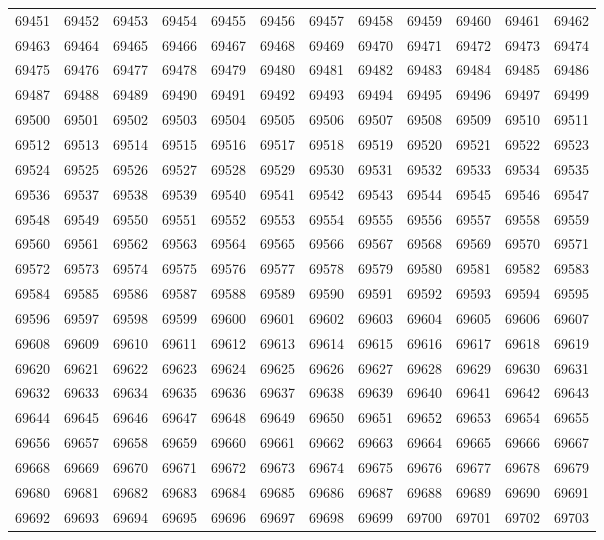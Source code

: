 \begin{center}
\begin{longtable}{llllllllllll}
69451 &69452 &69453 &69454 &69455 &69456 &69457 &69458 &69459 &69460 &69461 &69462 \\
69463 &69464 &69465 &69466 &69467 &69468 &69469 &69470 &69471 &69472 &69473 &69474 \\
69475 &69476 &69477 &69478 &69479 &69480 &69481 &69482 &69483 &69484 &69485 &69486 \\
69487 &69488 &69489 &69490 &69491 &69492 &69493 &69494 &69495 &69496 &69497 &69499 \\
69500 &69501 &69502 &69503 &69504 &69505 &69506 &69507 &69508 &69509 &69510 &69511 \\
69512 &69513 &69514 &69515 &69516 &69517 &69518 &69519 &69520 &69521 &69522 &69523 \\
69524 &69525 &69526 &69527 &69528 &69529 &69530 &69531 &69532 &69533 &69534 &69535 \\
69536 &69537 &69538 &69539 &69540 &69541 &69542 &69543 &69544 &69545 &69546 &69547 \\
69548 &69549 &69550 &69551 &69552 &69553 &69554 &69555 &69556 &69557 &69558 &69559 \\
69560 &69561 &69562 &69563 &69564 &69565 &69566 &69567 &69568 &69569 &69570 &69571 \\
69572 &69573 &69574 &69575 &69576 &69577 &69578 &69579 &69580 &69581 &69582 &69583 \\
69584 &69585 &69586 &69587 &69588 &69589 &69590 &69591 &69592 &69593 &69594 &69595 \\
69596 &69597 &69598 &69599 &69600 &69601 &69602 &69603 &69604 &69605 &69606 &69607 \\
69608 &69609 &69610 &69611 &69612 &69613 &69614 &69615 &69616 &69617 &69618 &69619 \\
69620 &69621 &69622 &69623 &69624 &69625 &69626 &69627 &69628 &69629 &69630 &69631 \\
69632 &69633 &69634 &69635 &69636 &69637 &69638 &69639 &69640 &69641 &69642 &69643 \\
69644 &69645 &69646 &69647 &69648 &69649 &69650 &69651 &69652 &69653 &69654 &69655 \\
69656 &69657 &69658 &69659 &69660 &69661 &69662 &69663 &69664 &69665 &69666 &69667 \\
69668 &69669 &69670 &69671 &69672 &69673 &69674 &69675 &69676 &69677 &69678 &69679 \\
69680 &69681 &69682 &69683 &69684 &69685 &69686 &69687 &69688 &69689 &69690 &69691 \\
69692 &69693 &69694 &69695 &69696 &69697 &69698 &69699 &69700 &69701 &69702 &69703 \\

\end{longtable}
\end{center}
